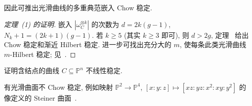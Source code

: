因此可推出光滑曲线的多重典范嵌入 Chow 稳定.
\begin{proof}[定理~(1) 的证明]
嵌入 $|\omega_C^{\otimes k}|$ 的次数为 $d=2k(g-1)$, $N_k+1=(2k+1)(g-1)$. 若 $k\geq5$ (其实 $k\geq3$ 即可), 则 $d>2g$, 定理~ 给出 Chow 稳定和渐近 Hilbert 稳定. 进一步可找出充分大的 $m$, 使每条此类光滑曲线 $m$-Hilbert 稳定; 见~\cite[定理 1.0.0]{Gie82}.
\end{proof}
\begin{exercise}\label{src:6.8.24}
证明含结点的曲线 $C\subseteq\mathbb P^n$ 不线性稳定.
\end{exercise}
\begin{remark}\label{src:6.8.25}
有光滑曲面不 Chow 稳定, 例如映射 $\mathbb P^2\to\mathbb P^4$, $[x:y:z]\mapsto[xz:yz:x^2:xy:y^2]$ 的像定义的 Steiner 曲面~\cite[例 3.6]{Mor80}.
\end{remark}
